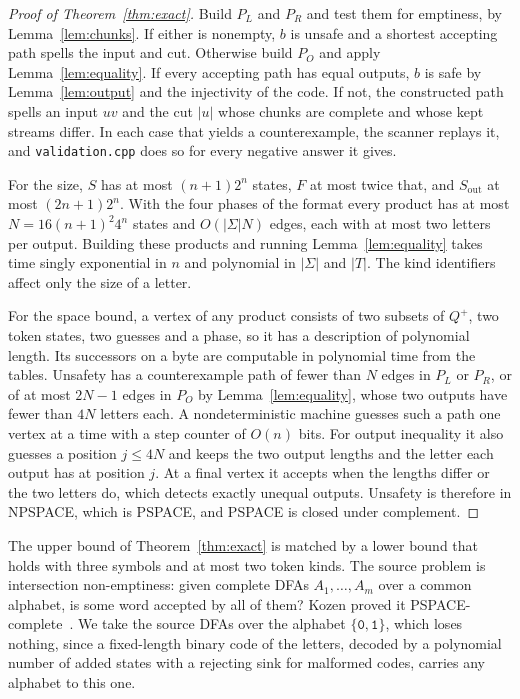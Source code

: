\documentclass[11pt,a4paper]{article}
\theoremstyle{definition}
\theoremstyle{plain}
\newcommand{\code}[1]{\texttt{#1}}
\begin{document}
\begin{proof}[Proof of Theorem~\ref{thm:exact}]
Build $P_L$ and $P_R$ and test them for emptiness, by Lemma~\ref{lem:chunks}. If either is nonempty, $b$ is unsafe and a
shortest accepting path spells the input and cut. Otherwise build $P_O$ and apply Lemma~\ref{lem:equality}. If every
accepting path has equal outputs, $b$ is safe by Lemma~\ref{lem:output} and the injectivity of the code. If not, the
constructed path spells an input $uv$ and the cut $|u|$ whose chunks are complete and whose kept streams differ. In each
case that yields a counterexample, the scanner replays it, and \code{validation.cpp} does so for every negative answer
it gives.

For the size, $S$ has at most $(n + 1)2^n$ states, $F$ at most twice that, and $S_{\mathrm{out}}$ at most $(2n + 1)2^n$.
With the four phases of the format every product has at most $N = 16(n + 1)^2 4^n$ states and $O(|\Sigma| N)$ edges,
each with at most two letters per output. Building these products and running Lemma~\ref{lem:equality} takes time singly
exponential in $n$ and polynomial in $|\Sigma|$ and $|T|$. The kind identifiers affect only the size of a letter.

For the space bound, a vertex of any product consists of two subsets of $Q^+$, two token states, two guesses and a
phase, so it has a description of polynomial length. Its successors on a byte are computable in polynomial time from the
tables. Unsafety has a counterexample path of fewer than $N$ edges in $P_L$ or $P_R$, or of at most $2N - 1$ edges in
$P_O$ by Lemma~\ref{lem:equality}, whose two outputs have fewer than $4N$ letters each. A nondeterministic machine
guesses such a path one vertex at a time with a step counter of $O(n)$ bits. For output inequality it also guesses a
position $j \leq 4N$ and keeps the two output lengths and the letter each output has at position $j$. At a final vertex
it accepts when the lengths differ or the two letters do, which detects exactly unequal outputs. Unsafety is therefore
in NPSPACE, which is PSPACE, and PSPACE is closed under complement.
\end{proof}

The upper bound of Theorem~\ref{thm:exact} is matched by a lower bound that holds with three symbols and at most two
token kinds. The source problem is intersection non-emptiness: given complete DFAs $A_1, \ldots, A_m$ over a common
alphabet, is some word accepted by all of them? Kozen proved it PSPACE-complete~\cite[Lemma~3.2.3,
p.~261]{kozen1977lower}. We take the source DFAs over the alphabet $\{\code{0}, \code{1}\}$, which loses nothing, since
a fixed-length binary code of the letters, decoded by a polynomial number of added states with a rejecting sink for
malformed codes, carries any alphabet to this one.
\end{document}

